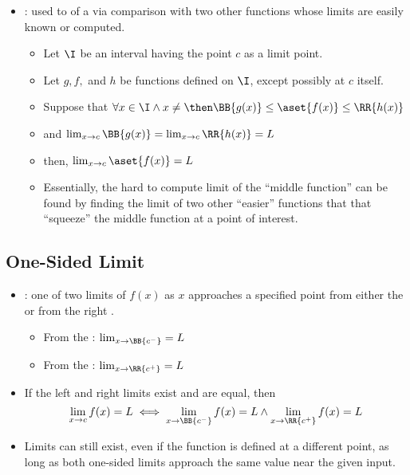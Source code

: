 \begin{itemize}
\begin{itemize}
    \item {}: used to  of a
       via comparison with two other
      functions whose limits are easily known or computed.
      \begin{itemize}
        \item Let \( \I  \) be an interval having the point \( c \) as a limit point.
        \item Let \( g, f, \) and \( h \) be functions defined on \( \I \),
          except possibly at \( c \) itself.
        \item Suppose that \( \forall x \in \I \land x \neq \then \BB{g(x)} \le
          \aset{f(x)} \le \RR{h(x)} \)
        \item and \( \lim_{x \to c} \BB{g(x)} = \lim_{x \to c} \RR{h(x)} = L \)
        \item then, \( \lim_{x \to c} \aset{f(x)} = L \)
        \item Essentially, the hard to compute limit of the ``middle function''
          can be found by finding the limit of two other ``easier'' functions
          that that ``squeeze'' the middle function at a point of interest.
      \end{itemize}

  \end{itemize}

  \subsection{One-Sided Limit}
  \begin{itemize}
    \item {}: one of two limits of \( f(x) \) as \( x \)
      approaches a specified point from either the  or from the right
      .
      \begin{multicols}{2}
        \begin{itemize}
          \item From the : \( \lim_{x \to \BB{c^-}} = L \)
          \item From the : \( \lim_{x \to \RR{c^+}} = L \)
        \end{itemize}
      \end{multicols}

    \item If the left and right limits exist and are equal, then
    \[
      \lim_{x \to c} f(x) = L \iff \lim_{x \to \BB{c^-}} f(x) = L \land
        \lim_{ x \to \RR{c^+}} f(x) = L
    \]
    \item Limits can still exist, even if the function is defined at a
      different point, as long as both one-sided limits approach the same value
      near the given input.

  \end{itemize}
\end{itemize}

